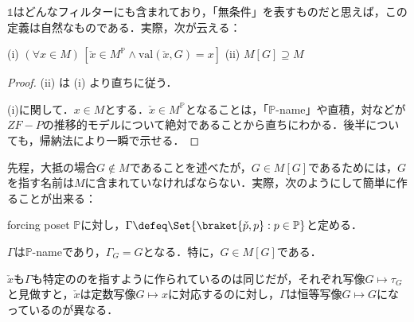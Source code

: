 \documentclass[a4j]{ltjsarticle}
\newcommand{\val}{\mathrm{val}}
\begin{document}
$\mathds{1}$はどんなフィルターにも含まれており，「無条件」を表すものだと思えば，この定義は自然なものである．実際，次が云える：
\begin{lemma}
 (i) $(\forall x \in M)\, \left[ \check{x} \in M^\mathbb{P} \wedge \val(\check{x}, G) = x\right]$\label{cond:x-check-is-m-p-name}
  \quad (ii) $M[G] \supseteq M$\label{cond:mg-includes-m}
\end{lemma}
\begin{proof}
 (ii) は (i) より直ちに従う．

 (i)に関して．$x \in M$とする．$\check{x} \in M^\mathbb{P}$となることは，「$\mathbb{P}$-name」や直積，対などが$ZF-P$の推移的モデルについて絶対であることから直ちにわかる．後半についても，帰納法により一瞬で示せる．\mbox{}
\end{proof}

先程，大抵の場合$G \notin M$であることを述べたが，$G \in M[G]$であるためには，$G$を指す名前は$M$に含まれていなければならない．実際，次のようにして簡単に作ることが出来る：
\begin{definition}
 forcing poset $\mathbb{P}$に対し，$\Gamma \defeq \Set{ \braket{\check{p}, p} : p \in \mathbb{P}}$と定める．
\end{definition}
\begin{lemma}
 $\Gamma$は$\mathbb{P}$-nameであり，$\Gamma_G = G$となる．特に，$G \in M[G]$である．
\end{lemma}

$\check{x}$も$\Gamma$も特定ののを指すように作られているのは同じだが，それぞれ写像$G \mapsto \tau_G$と見做すと，$\check{x}$は定数写像$G \mapsto x$に対応するのに対し，$\Gamma$は恒等写像$G \mapsto G$になっているのが異なる．
\end{document}
